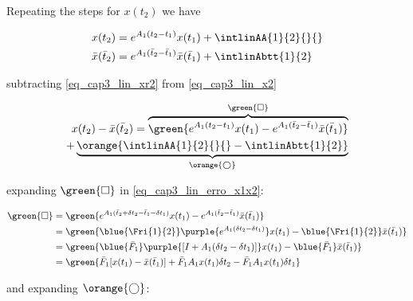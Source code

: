 
Repeating the steps for $x(t_2)$ we have

\noindent
\begin{align}
	\label{eq_cap3_lin_x2}
	x(t_2)  &= e^{A_1(t_2-t_1)}x(t_1) + \intlinAA{1}{2}{}{} \\
	\label{eq_cap3_lin_xr2}
	\bar{x}(\bar{t}_2) &= e^{A_1(\bar{t}_2-\bar{t}_1)}\bar{x}(\bar{t}_1) + \intlinAbtt{1}{2}
\end{align}

\noindent 
subtracting \eqref{eq_cap3_lin_xr2} from \eqref{eq_cap3_lin_x2} 

\begin{equation}
	\label{eq_cap3_lin_erro_x1x2}
	\begin{split}
		x(t_2) - \bar{x}(\bar{t}_2) = 
		\overbrace{\green{e^{A_1(t_2-t_1)}x(t_1) - e^{A_1(\bar{t}_2-\bar{t}_1)}\bar{x}(\bar{t}_1)}}^{\green{\square}} \\ 
		+ \underbrace{\orange{\intlinAA{1}{2}{}{} - \intlinAbtt{1}{2}}}_{\orange{\bigcirc}}
	\end{split}
\end{equation}

\noindent 
expanding $\green{\square}$ in \eqref{eq_cap3_lin_erro_x1x2}:

\noindent
\begin{align}
	\green{ \square } &=
	\green{
		e^{A_1(\bar{t}_2 + \delta t_2 - \bar{t}_1 - \delta t_1)} x(t_1)
		- e^{A_1(\bar{t}_2 - \bar{t}_1)} \bar{x}(\bar{t}_1)
	} \nonumber \\
	&= \green{
		\blue{\Fri{1}{2}} \purple{e^{A_1(\delta t_2 - \delta t_1)}} x(t_1)
		- \blue{\Fri{1}{2}} \bar{x}(\bar{t}_1)
	} \nonumber \\
	&= \green{
		\blue{\bar{F}_1} \purple{[I + A_1(\delta t_2 - \delta t_1)]} x(t_1)
		- \blue{\bar{F}_1} \bar{x}(\bar{t}_1)
	} \nonumber \\
	\label{eq_cap3_lin_x2_green}
	&= \green{
		\bar{F}_1 [x(t_1) - \bar{x}(\bar{t}_1)] + \bar{F}_1 A_1 x(t_1) \delta t_2
		- \bar{F}_1 A_1 x(t_1) \delta t_1
	}
\end{align}

\noindent 
and expanding $\orange{\bigcirc}$:

